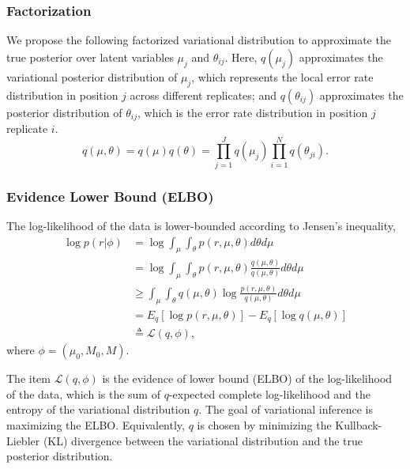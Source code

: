 \documentclass[11pt,reqno]{amsart}
\begin{document}
\subsubsection{Factorization}
We propose the following factorized variational distribution to approximate the true posterior over latent variables $\mu_j$ and $\theta_{ij}$.
Here, $q(\mu_j)$ approximates the variational posterior distribution of $\mu_j$, which represents the local error rate distribution in position $j$ across different replicates;
and $q(\theta_{ij})$ approximates the posterior distribution of $\theta_{ij}$, which is the error rate distribution in position $j$ replicate $i$.
\begin{equation}
  q(\mu, \theta) = q(\mu)q(\theta) = \prod_{j=1}^J q(\mu_{j}) \prod_{i=1}^N q(\theta_{ji}).
  \label{eq:vardist}
\end{equation}

\subsubsection{Evidence Lower Bound (ELBO)}
The log-likelihood of the data is lower-bounded according to Jensen's inequality,
\begin{equation}
\begin{split}
\log p \left( r | \phi \right) &= \log \int_\mu \int_\theta p\left(r,\mu,\theta \right) d\theta d\mu \\
&= \log \int_\mu \int_\theta p\left(r,\mu,\theta \right)\frac{q\left(\mu,\theta \right) }{q\left(\mu,\theta \right) } d\theta d\mu \\
&\geq \int_\mu \int_\theta q\left(\mu,\theta \right) \log \frac{ p\left(r,\mu,\theta \right)}{q\left(\mu,\theta \right)} d\theta d\mu \\
&= E_q \left[ \log p\left(r,\mu,\theta \right)\right] - E_q \left[ \log q\left(\mu,\theta \right)\right] \\
&\triangleq \mathcal{L}(q, \phi),
\end{split}
\end{equation}
where $ \phi= \left( \mu_0, M_0, M \right) $.

The item $\mathcal{L}(q, \phi)$ is the evidence of lower bound (ELBO) of the log-likelihood of the data, which is the sum of $q$-expected complete log-likelihood and the entropy of the variational distribution $q$.
The goal of variational inference is maximizing the ELBO.
Equivalently, $q$ is chosen by minimizing the Kullback-Liebler (KL) divergence between the variational distribution and the true posterior distribution.
\end{document}
